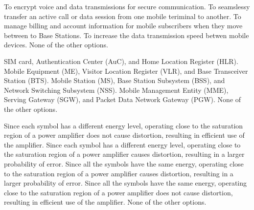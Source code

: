 \begin{questions}
    \begin{checkboxes}
        \choice To encrypt voice and data transmissions for secure communication.
        \choice To seamslessy transfer an active call or data session from one mobile teriminal to another.
        \choice To manage billing and account information for mobile subscribers when they move between to Base Stations.
        \choice To increase the data transmission speed betwen mobile devices.
        \CorrectChoice None of the other options.
    \end{checkboxes}

    \begin{checkboxes}
        \CorrectChoice SIM card, Authentication Center (AuC), and Home Location Register (HLR).
        \choice Mobile Equipment (ME), Visitor Location Register (VLR), and Base Transceiver Station (BTS).
        \choice Mobile Station (MS), Base Station Subsystem (BSS), and Network Switching Subsystem (NSS).
        \choice Mobile Management Entity (MME), Serving Gateway (SGW), and Packet Data Network Gateway (PGW).
        \choice None of the other options.
    \end{checkboxes}

    \begin{checkboxes}
        \choice Since each symbol has a different energy level, operating close to the saturation region of a power amplifier does not cause distortion, resulting in efficient use of the amplifier.
        \choice Since each symbol has a different energy level, operating close to the saturation region of a power amplifier causes distortion, resulting in a larger probability of error.
        \choice Since all the symbols have the same energy, operating close to the saturation region of a power amplifier causes distortion, resulting in a larger probability of error.
        \CorrectChoice Since all the symbols have the same energy, operating close to the saturation region of a power amplifier does not cause distortion, resulting in efficient use of the amplifier.
        \choice None of the other options.
    \end{checkboxes}



\end{questions}
